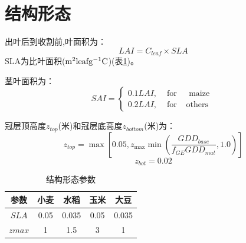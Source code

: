 \section{结构形态}
出叶后到收割前,叶面积为：
\begin{equation}
LAI=C_{leaf} \times SLA
\end{equation}
SLA为比叶面积($\rm m^2 leaf g^{-1} C$)(表\ref{tab:结构形态参数})。

茎叶面积为：
\begin{equation}
SAI=\left\{\begin{array}{lcc}0.1 LAI, & \text { for } & \text { maize } \\
   0.2 LAI, & \text { for } & \text {others}\end{array}\right.
\end{equation}

冠层顶高度$z_{top}$(米)和冠层底高度$z_{bottom}$(米)为：
\begin{equation}
z_{top}=\max \left[0.05, z_{\max} \min \left(\frac{GDD_{base}}{f_{GE} G D D_{mat}}, 1.0\right)\right]
\end{equation}
\begin{equation}
z_{b o t}=0.02
\end{equation}

\begin{table}[]
  \centering
  \caption{结构形态参数}
  \label{tab:结构形态参数}
  \begin{tabular}{@{}ccccc@{}}
  \toprule
  参数   & 小麦   & 水稻    & 玉米   & 大豆    \\ \midrule
  $SLA$  & 0.05 & 0.035 & 0.05 & 0.035 \\
  $zmax$ & 1    & 1.5   & 3    & 1     \\ \bottomrule
  \end{tabular}
\end{table}

